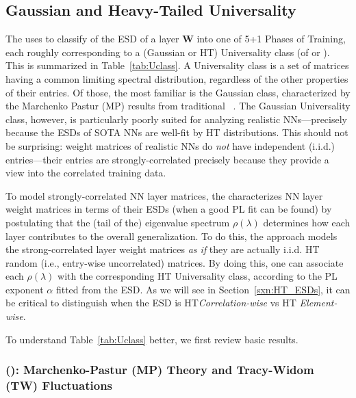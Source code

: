 
\subsection{Gaussian and Heavy-Tailed Universality}
\label{sxn:guass_ht_univ}

The \HTSR \Phenomenology uses \RMT to classify of the ESD of a layer $\mathbf{W}$ into one of 5+1 Phases of Training, 
each roughly corresponding to a (Gaussian or HT) Universality class (of \RMT or \HTRMT).
This is summarized in Table~\ref{tab:Uclass}. 
A Universality class is a set of matrices having a common limiting spectral distribution, regardless of the other properties of their entries. 
Of those, the most familiar is the Gaussian class, characterized by the Marchenko Pastur (MP) results from traditional \RMT~\cite{EW13,potters_bouchaud_2020}. 
The Gaussian Universality class, however, is particularly poorly suited for analyzing realistic NNs---precisely
because the ESDs of SOTA NNs are well-fit by HT distributions.
This should not be surprising: weight matrices of realistic NNs do \emph{not} have independent (i.i.d.)
entries---their entries are strongly-correlated precisely because they provide a view into the correlated training data.

To model strongly-correlated NN layer matrices, the \HTSR \Phenomenology characterizes NN layer weight matrices
in terms of their ESDs (when a good PL fit can be found) by postulating that the (tail of the) eigenvalue spectrum $\rho(\lambda)$ 
determines how each layer contributes to the overall generalization.  
To do this, the \HTSR approach models the strong-correlated layer weight matrices \emph{as if} they are actually i.i.d. HT random
(i.e., entry-wise uncorrelated) matrices. 
By doing this, one can  associate each $\rho(\lambda)$ with 
the corresponding HT Universality class, according to the PL exponent $\alpha$ fitted from the ESD. 
As we will see in 
Section~\ref{sxn:HT_ESDs}, it can be critical to distinguish  when the ESD is HT\emph{Correlation-wise} vs HT \emph{Element-wise}.

To understand Table~\ref{tab:Uclass} better, we first review basic results.  %


\subsubsection{\RandomMatrixTheory (\RMT):  Marchenko-Pastur (MP) Theory and Tracy-Widom (TW) Fluctuations}

